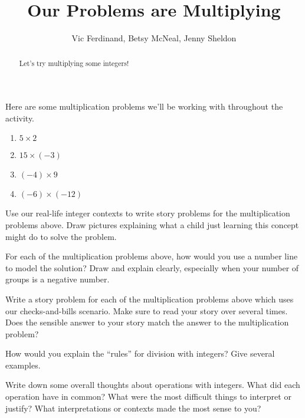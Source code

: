 \documentclass{ximera}
\title{Our Problems are Multiplying}
\author{Vic Ferdinand, Betsy McNeal, Jenny Sheldon}
\begin{document}
\begin{abstract}
    Let's try multiplying some integers!
\end{abstract}
\maketitle



Here are some multiplication problems we'll be working with throughout the activity.

\begin{enumerate}
    \item $5 \times 2$
    \item $15 \times (-3)$
    \item $(-4) \times 9$
    \item $(-6) \times (-12)$
\end{enumerate}


\begin{problem}
Use our real-life integer contexts to write story problems for the multiplication problems above.  Draw pictures explaining what a child just learning this concept might do to solve the problem.

\end{problem}

\begin{problem}
For each of the multiplication problems above, how would you use a number line to model the solution?  Draw and explain clearly, especially when your number of groups is a negative number.
\end{problem}

\begin{problem}
Write a story problem for each of the multiplication problems above which uses our checks-and-bills scenario.  Make sure to read your story over several times.  Does the sensible answer to your story match the answer to the multiplication problem?
\end{problem}

\begin{problem}
How would you explain the ``rules'' for division with integers?  Give several examples.


\end{problem}


\begin{problem}
Write down some overall thoughts about operations with integers.  What did each operation have in common?  What were the most difficult things to interpret or justify?  What interpretations or contexts made the most sense to you?


\end{problem}
\end{document}
